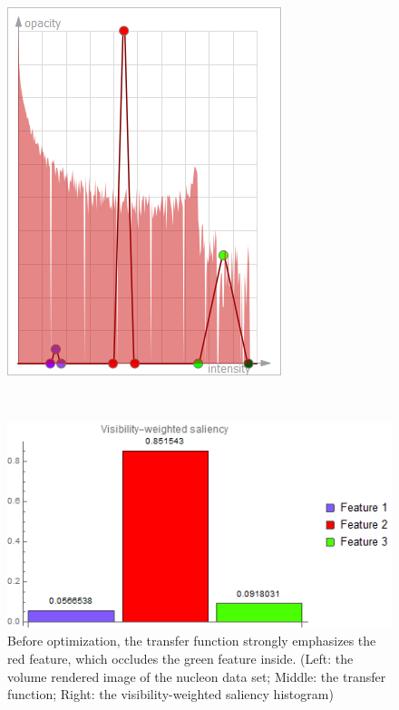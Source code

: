\begin{figure}
\begin{minipage}{.2\textwidth}
		\includegraphics[width=1\linewidth]{images/tf_nucleon_strong_red}	
	\end{minipage}~
	\begin{minipage}{.4\textwidth}
		\includegraphics[width=1\linewidth]{images/nucleon_strong_red_visibility_saliency_weighted_chart}
	\end{minipage}
	\caption{Before optimization, the transfer function strongly emphasizes the red feature, which occludes the green feature inside. (Left: the volume rendered image of the nucleon data set; Middle: the transfer function; Right: the visibility-weighted saliency histogram)}
	\label{fig:nucleon_strong_red}
\end{figure}

